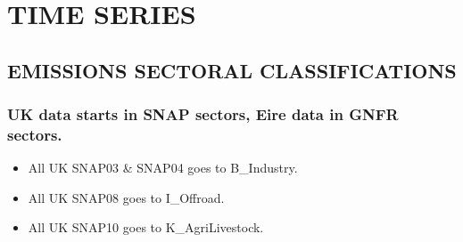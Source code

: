 \documentclass[
]{article}
\begin{document}
\newpage

\section{TIME SERIES}\label{time-series}

\newpage

\subsection{EMISSIONS SECTORAL
CLASSIFICATIONS}\label{emissions-sectoral-classifications}

\subsubsection{UK data starts in SNAP sectors, Eire data in GNFR
sectors.}\label{uk-data-starts-in-snap-sectors-eire-data-in-gnfr-sectors.}

\begin{itemize}
\item
  All UK SNAP03 \& SNAP04 goes to B\_Industry.
\item
  All UK SNAP08 goes to I\_Offroad.
\item
  All UK SNAP10 goes to K\_AgriLivestock.
\end{itemize}
\end{document}
